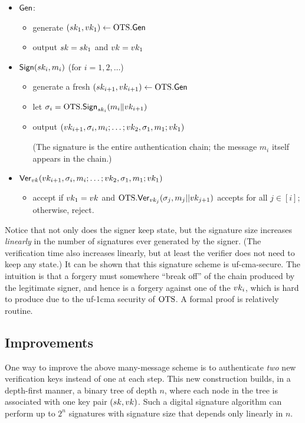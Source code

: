 \documentclass[11pt]{article}
\begin{document}
\begin{itemize}
\item $\mathsf{Gen}$:
  \begin{itemize}
  \item generate $(sk_1,vk_1) \gets \text{OTS}.\mathsf{Gen}$
  \item output $sk = sk_1$ and $vk = vk_1$
  \end{itemize}

\item $\mathsf{Sign}(sk_i,m_i)$ (for $i=1,2, \ldots$)
  \begin{itemize}
  \item generate a fresh $(sk_{i+1}, vk_{i+1}) \gets \text{OTS}.\mathsf{Gen}$
  \item let $\sigma_i = \text{OTS}.\mathsf{Sign}_{sk_{i}}(m_i \| vk_{i+1})$
  \item output $(vk_{i+1}, \sigma_{i}, m_{i}; \ldots; vk_{2},
    \sigma_1, m_1; vk_1)$

    (The signature is the entire authentication chain; the message
    $m_{i}$ itself appears in the chain.)
  \end{itemize}

\item $\mathsf{Ver}_{vk}(vk_{i+1}, \sigma_i,m_i; \ldots; vk_{2},
  \sigma_1, m_1; vk_1)$
  \begin{itemize}
  \item accept if $vk_{1} = vk$ and
    $\text{OTS}.\mathsf{Ver}_{vk_{j}}(\sigma_{j}, m_j||vk_{j+1})$ accepts for
    all $j \in [i]$; otherwise, reject.
  \end{itemize}
\end{itemize}

Notice that not only does the signer keep state, but the signature
size increases \emph{linearly} in the number of signatures ever
generated by the signer.  (The verification time also increases
linearly, but at least the verifier does not need to keep any state.)
It can be shown that this signature scheme is uf-cma-secure.  The
intuition is that a forgery must somewhere ``break off'' of the chain
produced by the legitimate signer, and hence is a forgery against one
of the $vk_{i}$, which is hard to produce due to the uf-1cma security
of $\text{OTS}$.  A formal proof is relatively routine.

\subsection{Improvements}
\label{sec:improvements}

One way to improve the above many-message scheme is to authenticate
\emph{two} new verification keys instead of one at each step.  This
new construction builds, in a depth-first manner, a binary tree of
depth $n$, where each node in the tree is associated with one key pair
$(sk,vk)$.  Such a digital signature algorithm can perform up to
$2^n$ signatures with signature size that depends only linearly in
$n$.
\end{document}
